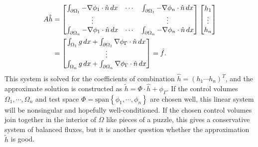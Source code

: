 \newcommand{\integralentry}[2]{\int_{\pom_{#1}}-\nabla\phi_{#2}\cdot\hat{n}\,dx}
\newcommand{\integralrhsentry}[1]{\int_{\om_{#1}}g\,dx + \int_{\pom_{#1}}\nabla\phi_\Gamma\cdot\hat{n}\,dx}
\begin{equation}\label{poisson_matrix_equation}
\begin{split}
    A\hat{h}
    &= \begin{bmatrix}
            \integralentry{1}{1} & \cdots & \integralentry{1}{n} \\
            \vdots & & \vdots \\
            \integralentry{n}{1} & \cdots & \integralentry{n}{n}
    \end{bmatrix}
    \begin{bmatrix} h_1 \\ \vdots \\ h_n \end{bmatrix}
    \\
    &= \begin{bmatrix} \integralrhsentry{1} \\ \vdots \\ \integralrhsentry{n}  \end{bmatrix}
    = \hat{f}.
\end{split}
\end{equation}
This system is solved for the coefficients of combination $\hat{h} = (h_1 \cdots h_n)^T$, and the approximate
solution is constructed as $\tilde{h} = \Phi\cdot\hat{h} + \phi_\Gamma$.
If the control volumes $\Omega_1,\cdots,\Omega_n$ and test space $\Phi = \text{span}\left\{\phi_1,\cdots,\phi_n\right\}$
are chosen well, this linear system will be nonsingular and hopefully well-conditioned.
If the chosen control volumes join together in the interior of $\Omega$ like pieces of a puzzle, this gives a conservative system of balanced fluxes, but it is another question whether the approximation
$\tilde{h}$ is good.

\newpage
